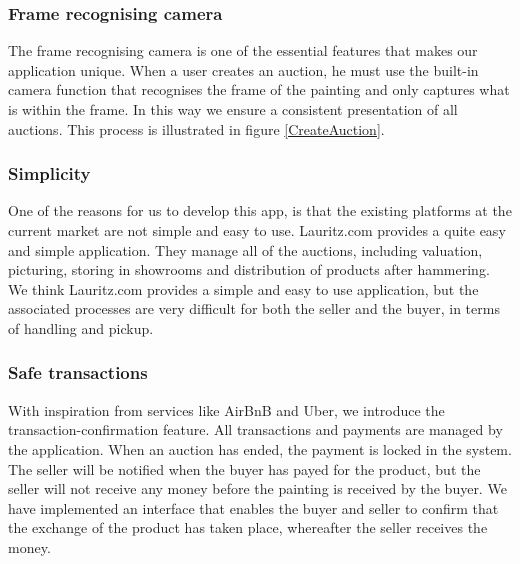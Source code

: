 \subsubsection{Frame recognising camera}
\label{FrameCamera}
The frame recognising camera is one of the essential features that makes our application unique. When a user creates an auction, he must use the built-in camera function that recognises the frame of the painting and only captures what is within the frame. In this way we ensure a consistent presentation of all auctions. This process is illustrated in figure \ref{CreateAuction}.

\subsubsection{Simplicity}
One of the reasons for us to develop this app, is that the existing platforms at the current market are not simple and easy to use. Lauritz.com provides a quite easy and simple application. They manage all of the auctions, including valuation, picturing, storing in showrooms and distribution of products after hammering. We think Lauritz.com provides a simple and easy to use application, but the associated processes are very difficult for both the seller and the buyer, in terms of handling and pickup. 

\subsubsection{Safe transactions}
With inspiration from services like AirBnB and Uber, we introduce the transaction-confirmation feature. All transactions and payments are managed by the application. When an auction has ended, the payment is locked in the system. The seller will be notified when the buyer has payed for the product, but the seller will not receive any money before the painting is received by the buyer. We have implemented an interface that enables the buyer and seller to confirm that the exchange of the product has taken place, whereafter the seller receives the money.  
